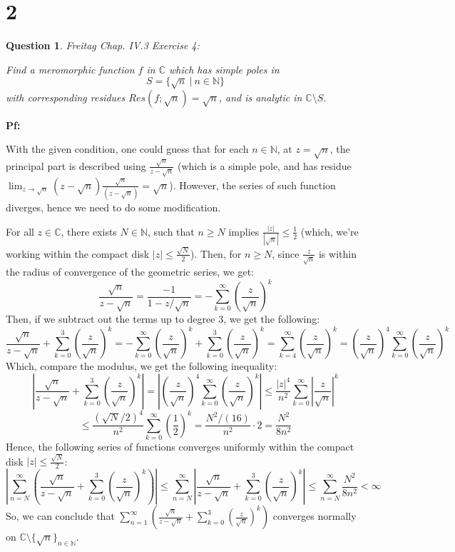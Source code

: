 \documentclass{article}
\newtheorem{question}{Question}
\begin{document}
\break

\section*{2}
\begin{myBox}[]{}
    \begin{question}
        Freitag Chap. IV.3 Exercise 4:

        Find a meromorphic function $f$ in $\mathbb{C}$ which has simple poles in 
        $$S=\{\sqrt{n}\ |\ n\in\mathbb{N}\}$$
        with corresponding residues $Res(f;\sqrt{n})=\sqrt{n}$, and is analytic in $\mathbb{C}\setminus S$.
    \end{question}
\end{myBox}

\textbf{Pf:}

With the given condition, one could guess that for each $n\in\mathbb{N}$, at $z=\sqrt{n}$, the principal part is described using $\frac{\sqrt{n}}{z-\sqrt{n}}$ (which is a simple pole, and has residue $\lim_{z\rightarrow\sqrt{n}}(z-\sqrt{n})\frac{\sqrt{n}}{(z-\sqrt{n})}=\sqrt{n}$). 
However, the series of such function diverges, hence we need to do some modification.

\hfil

For all $z\in\mathbb{C}$, there exists $N\in\mathbb{N}$, such that $n\geq N$ implies $\frac{|z|}{|\sqrt{n}|}\leq\frac{1}{2}$ (which, we're working within the compact disk $|z|\leq \frac{\sqrt{N}}{2}$). Then, for $n\geq N$, since $\frac{z}{\sqrt{n}}$ is within the radius of convergence of the geometric series, we get:
$$\frac{\sqrt{n}}{z-\sqrt{n}}=\frac{-1}{1-z/\sqrt{n}}=-\sum_{k=0}^{\infty}\left(\frac{z}{\sqrt{n}}\right)^k$$
Then, if we subtract out the terms up to degree 3, we get the following:
$$\frac{\sqrt{n}}{z-\sqrt{n}}+\sum_{k=0}^{3}\left(\frac{z}{\sqrt{n}}\right)^k=-\sum_{k=0}^{\infty}\left(\frac{z}{\sqrt{n}}\right)^k+\sum_{k=0}^{3}\left(\frac{z}{\sqrt{n}}\right)^k=\sum_{k=4}^{\infty}\left(\frac{z}{\sqrt{n}}\right)^k = \left(\frac{z}{\sqrt{n}}\right)^4\sum_{k=0}^{\infty}\left(\frac{z}{\sqrt{n}}\right)^k$$
Which, compare the modulus, we get the following inequality:
$$\left|\frac{\sqrt{n}}{z-\sqrt{n}}+\sum_{k=0}^{3}\left(\frac{z}{\sqrt{n}}\right)^k\right|= \left|\left(\frac{z}{\sqrt{n}}\right)^4\sum_{k=0}^{\infty}\left(\frac{z}{\sqrt{n}}\right)^k\right|\leq\frac{|z|^4}{n^2}\sum_{k=0}^{\infty}\left|\frac{z}{\sqrt{n}}\right|^k$$
$$\leq \frac{(\sqrt{N}/2)^4}{n^2}\sum_{k=0}^{\infty}\left(\frac{1}{2}\right)^k = \frac{N^2/(16)}{n^2}\cdot 2 = \frac{N^2}{8n^2}$$
Hence, the following series of functions converges uniformly within the compact disk $|z|\leq \frac{\sqrt{N}}{2}$:
$$\left|\sum_{n=N}^{\infty}\left(\frac{\sqrt{n}}{z-\sqrt{n}}+\sum_{k=0}^{3}\left(\frac{z}{\sqrt{n}}\right)^k\right)\right|\leq \sum_{n=N}^{\infty}\left|\frac{\sqrt{n}}{z-\sqrt{n}}+\sum_{k=0}^{3}\left(\frac{z}{\sqrt{n}}\right)^k\right| \leq \sum_{n=N}^{\infty}\frac{N^2}{8n^2}<\infty$$
So, we can conclude that $\sum_{n=1}^{\infty}\left(\frac{\sqrt{n}}{z-\sqrt{n}}+\sum_{k=0}^{3}\left(\frac{z}{\sqrt{n}}\right)^k\right)$ converges normally on $\mathbb{C}\setminus\{\sqrt{n}\}_{n\in\mathbb{N}}$. 
\end{document}
